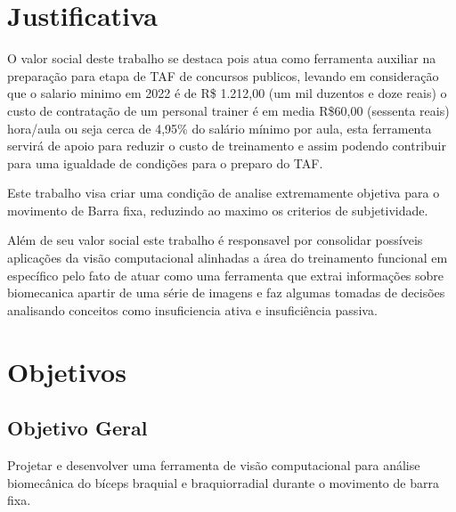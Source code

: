 \section{Justificativa}

O valor social deste trabalho se destaca  pois atua como ferramenta auxiliar na preparação para etapa de TAF de concursos publicos, levando em consideração que o salario minimo em 2022 é de R\$ 1.212,00 (um mil duzentos e doze reais) \cite{salarioMin} o custo de contratação de um personal trainer é em media R\$60,00 (sessenta reais) hora/aula \cite{valorPersonal}  ou seja cerca de 4,95\% do salário mínimo por aula,  esta ferramenta servirá de apoio para reduzir o custo de treinamento e assim podendo contribuir para uma igualdade de condições para o preparo do TAF.

Este trabalho visa criar uma condição de analise extremamente objetiva para o movimento de Barra fixa, reduzindo ao maximo os criterios de subjetividade.

Além de seu valor social este trabalho é responsavel por consolidar possíveis aplicações da visão computacional alinhadas a área do treinamento funcional em específico pelo fato de atuar como uma ferramenta que extrai informações sobre biomecanica apartir de uma série de imagens e faz algumas tomadas de decisões analisando conceitos como insuficiencia ativa e insuficiência passiva.




















\section{Objetivos}

\subsection{Objetivo Geral}	

Projetar e desenvolver uma ferramenta de visão computacional para análise biomecânica do bíceps braquial e braquiorradial durante o movimento de barra fixa.

